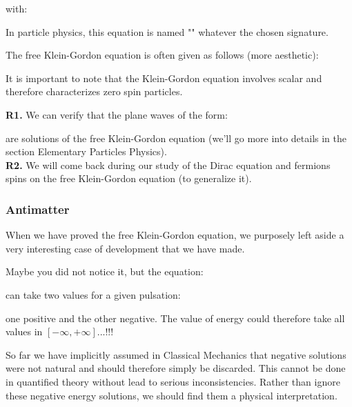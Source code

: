 	with:
	
	\begin{tcolorbox}[title=Remark,colframe=black,arc=10pt]
	In particle physics, this equation is named "" whatever the chosen signature.
	\end{tcolorbox}
	The free Klein-Gordon equation is often given as follows (more aesthetic):
	
	It is important to note that the Klein-Gordon equation involves scalar and therefore characterizes zero spin particles.
	\begin{tcolorbox}[title=Remarks,colframe=black,arc=10pt]
	\textbf{R1.} We can verify that the plane waves of the form:
	
	are solutions of the free Klein-Gordon equation (we'll go more into details in the section Elementary Particles Physics).\\
	
	\textbf{R2.} We will come back during our study of the Dirac equation and fermions spins on the free Klein-Gordon equation (to generalize it).
	\end{tcolorbox}
	
	\subsubsection{Antimatter}
	When we have proved the free Klein-Gordon equation, we purposely left aside a very interesting case of development that we have made.
	
	Maybe you did not notice it, but the equation:
	
	can take two values for a given pulsation:
	
	one positive and the other negative. The value of energy could therefore take all values in $[-\infty,+\infty]$...!!!
	
	So far we have implicitly assumed in Classical Mechanics that negative solutions were not natural and should therefore simply be discarded. This cannot be done in quantified theory without lead to serious inconsistencies. Rather than ignore these negative energy solutions, we should find them a physical interpretation.
	
